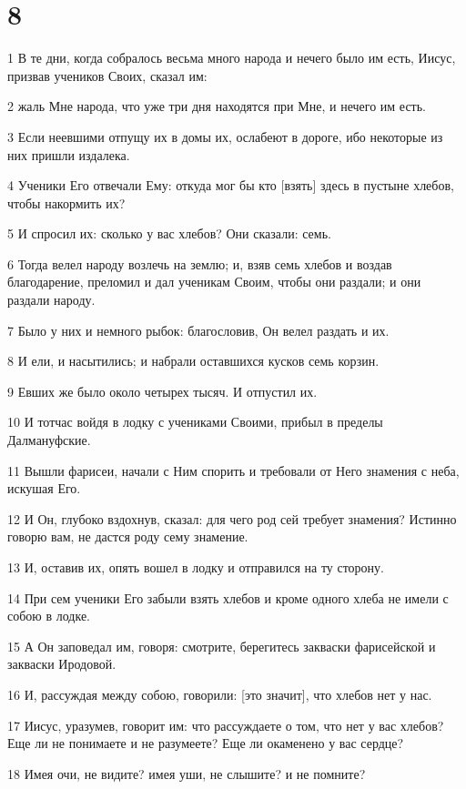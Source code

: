 \chapter{8}

\par 1 В те дни, когда собралось весьма много народа и нечего было им есть, Иисус, призвав учеников Своих, сказал им:
\par 2 жаль Мне народа, что уже три дня находятся при Мне, и нечего им есть.
\par 3 Если неевшими отпущу их в домы их, ослабеют в дороге, ибо некоторые из них пришли издалека.
\par 4 Ученики Его отвечали Ему: откуда мог бы кто [взять] здесь в пустыне хлебов, чтобы накормить их?
\par 5 И спросил их: сколько у вас хлебов? Они сказали: семь.
\par 6 Тогда велел народу возлечь на землю; и, взяв семь хлебов и воздав благодарение, преломил и дал ученикам Своим, чтобы они раздали; и они раздали народу.
\par 7 Было у них и немного рыбок: благословив, Он велел раздать и их.
\par 8 И ели, и насытились; и набрали оставшихся кусков семь корзин.
\par 9 Евших же было около четырех тысяч. И отпустил их.
\par 10 И тотчас войдя в лодку с учениками Своими, прибыл в пределы Далмануфские.
\par 11 Вышли фарисеи, начали с Ним спорить и требовали от Него знамения с неба, искушая Его.
\par 12 И Он, глубоко вздохнув, сказал: для чего род сей требует знамения? Истинно говорю вам, не дастся роду сему знамение.
\par 13 И, оставив их, опять вошел в лодку и отправился на ту сторону.
\par 14 При сем ученики Его забыли взять хлебов и кроме одного хлеба не имели с собою в лодке.
\par 15 А Он заповедал им, говоря: смотрите, берегитесь закваски фарисейской и закваски Иродовой.
\par 16 И, рассуждая между собою, говорили: [это значит], что хлебов нет у нас.
\par 17 Иисус, уразумев, говорит им: что рассуждаете о том, что нет у вас хлебов? Еще ли не понимаете и не разумеете? Еще ли окаменено у вас сердце?
\par 18 Имея очи, не видите? имея уши, не слышите? и не помните?
